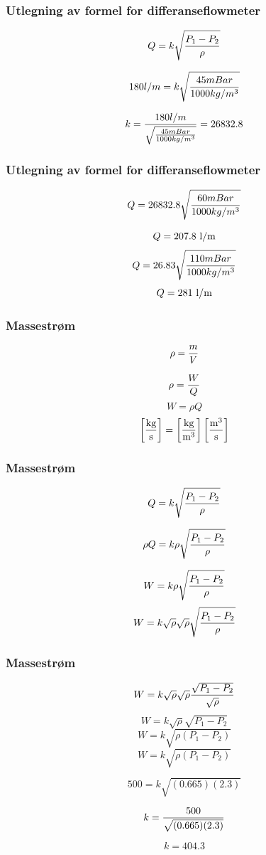 \documentclass[aspectratio=169,xcolor=dvipsnames]{beamer}
\begin{document}
\begin{frame}
	\frametitle{Utlegning av formel for differanseflowmeter}

$$Q = k \sqrt{{P_1 - P_2} \over \rho}$$

$$180 l/m = k \sqrt{{45mBar} \over 1000kg/m^3}$$

$$k = {180l/m \over \sqrt{45mBar \over 1000kg/m^3}} = 26832.8$$

\end{frame}
\begin{frame}
	\frametitle{Utlegning av formel for differanseflowmeter}



$$Q = 26832.8 \sqrt{60mBar \over 1000kg/m^3}$$

$$Q = 207.8 \hbox{ l/m}$$
$$Q = 26.83 \sqrt{110mBar \over 1000kg/m^3}$$
%
$$Q = 281 \hbox{ l/m}$$
\end{frame}





\begin{frame}
	\frametitle{Massestrøm}

$$\rho = {m \over V}$$

\vskip 0.5cm
$$\rho = {W \over Q}$$
\vskip 0.5cm
$$W = \rho Q$$
\vskip 0.5cm
$$\left[\hbox{kg} \over \hbox{s}\right] = \left[{\hbox{kg} \over \hbox{m}^3}\right] \left[{\hbox{m}^3 \over \hbox{s} }\right]$$
\end{frame}






\begin{frame}
	\frametitle{Massestrøm}
$$Q = k \sqrt{{P_1 - P_2} \over \rho}$$

$$\rho Q = k \rho \sqrt{{P_1 - P_2} \over \rho}$$

$$W = k \rho \sqrt{{P_1 - P_2} \over \rho}$$
$$W = k \sqrt{\rho} \sqrt{\rho} \sqrt{{P_1 - P_2} \over \rho}$$

\end{frame}
\begin{frame}
	\frametitle{Massestrøm}

$$W = k \sqrt{\rho} \sqrt{\rho} {\sqrt{P_1 - P_2} \over \sqrt{\rho}}$$
$$W = k \sqrt{\rho} \sqrt{P_1 - P_2}$$
$$W = k \sqrt{\rho(P_1 - P_2)}$$
$$W = k \sqrt{\rho(P_1 - P_2)}$$

$$500 = k \sqrt{(0.665)(2.3)}$$

$$k = {500 \over \sqrt{(0.665)(2.3)}}$$

$$k = 404.3$$
\end{frame}
\end{document}
